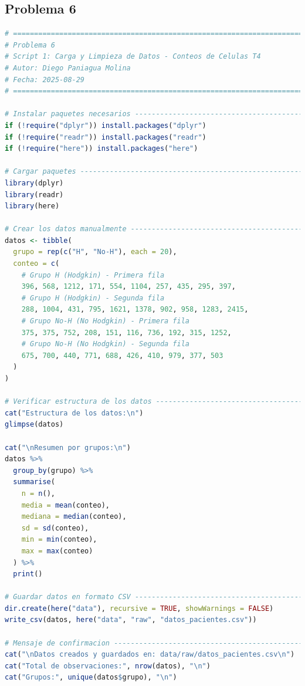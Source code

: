 \clearpage

\subsection{Problema \textcolor{CIMATRed}{6}}

\begin{lstlisting}[language=R, caption={Script 1: Carga y Limpieza de Datos - Conteos de Células T4.}, label={lst:script2}]
# =============================================================================
# Problema 6
# Script 1: Carga y Limpieza de Datos - Conteos de Celulas T4
# Autor: Diego Paniagua Molina
# Fecha: 2025-08-29
# =============================================================================

# Instalar paquetes necesarios ------------------------------------------------
if (!require("dplyr")) install.packages("dplyr")
if (!require("readr")) install.packages("readr")
if (!require("here")) install.packages("here")

# Cargar paquetes -------------------------------------------------------------
library(dplyr)
library(readr)
library(here)

# Crear los datos manualmente -------------------------------------------------
datos <- tibble(
  grupo = rep(c("H", "No-H"), each = 20),
  conteo = c(
    # Grupo H (Hodgkin) - Primera fila
    396, 568, 1212, 171, 554, 1104, 257, 435, 295, 397,
    # Grupo H (Hodgkin) - Segunda fila  
    288, 1004, 431, 795, 1621, 1378, 902, 958, 1283, 2415,
    # Grupo No-H (No Hodgkin) - Primera fila
    375, 375, 752, 208, 151, 116, 736, 192, 315, 1252,
    # Grupo No-H (No Hodgkin) - Segunda fila
    675, 700, 440, 771, 688, 426, 410, 979, 377, 503
  )
)

# Verificar estructura de los datos -------------------------------------------
cat("Estructura de los datos:\n")
glimpse(datos)

cat("\nResumen por grupos:\n")
datos %>%
  group_by(grupo) %>%
  summarise(
    n = n(),
    media = mean(conteo),
    mediana = median(conteo),
    sd = sd(conteo),
    min = min(conteo),
    max = max(conteo)
  ) %>%
  print()

# Guardar datos en formato CSV ------------------------------------------------
dir.create(here("data"), recursive = TRUE, showWarnings = FALSE)
write_csv(datos, here("data", "raw", "datos_pacientes.csv"))

# Mensaje de confirmacion -----------------------------------------------------
cat("\nDatos creados y guardados en: data/raw/datos_pacientes.csv\n")
cat("Total de observaciones:", nrow(datos), "\n")
cat("Grupos:", unique(datos$grupo), "\n")
\end{lstlisting}

